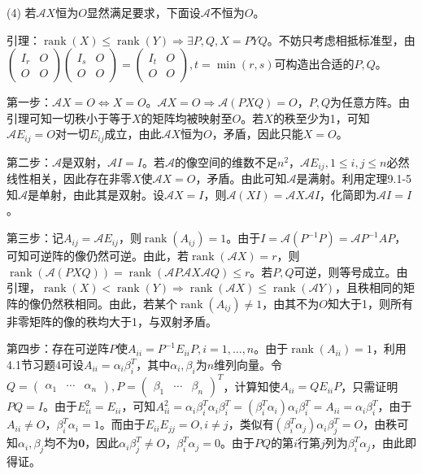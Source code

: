 \documentclass[a4paper,UTF8,fontset=windows]{ctexart}
\DeclareMathOperator{\rank}{rank}
\begin{document}
\begin{enumerate}
(4) 若$\mathcal{A}X$恒为$O$显然满足要求，下面设$\mathcal{A}$不恒为$O$。

引理：$\rank(X)\le\rank(Y)\Rightarrow\exists P,Q,X=PYQ$。不妨只考虑相抵标准型，由$\begin{pmatrix}I_r&O\\O&O\end{pmatrix}\begin{pmatrix}I_s&O\\O&O\end{pmatrix}=\begin{pmatrix}I_t&O\\O&O\end{pmatrix},t=\min(r,s)$可构造出合适的$P,Q$。

第一步：$\mathcal{A}X=O\Leftrightarrow X=O$。$\mathcal{A}X=O\Rightarrow\mathcal{A}(PXQ)=O$，$P,Q$为任意方阵。由引理可知一切秩小于等于$X$的矩阵均被映射至$O$。若$X$的秩至少为1，可知$\mathcal{A}E_{ij}=O$对一切$E_{ij}$成立，由此$\mathcal{A}X$恒为$O$，矛盾，因此只能$X=O$。

第二步：$\mathcal{A}$是双射，$\mathcal{A}I=I$。若$\mathcal{A}$的像空间的维数不足$n^2$，$\mathcal{A}E_{ij},1\le i,j\le n$必然线性相关，因此存在非零$X$使$\mathcal{A}X=O$，矛盾。由此可知$\mathcal{A}$是满射。利用定理9.1-5知$\mathcal{A}$是单射，由此其是双射。设$\mathcal{A}X=I$，则$\mathcal{A}(XI)=\mathcal{A}X\mathcal{A}I$，化简即为$\mathcal{A}I=I$。

第三步：记$A_{ij}=\mathcal{A}E_{ij}$，则$\rank(A_{ij})=1$。由于$I=\mathcal{A}(P^{-1}P)=\mathcal{A}P^{-1}AP$，可知可逆阵的像仍然可逆。由此，若$\rank(\mathcal{A}X)=r$，则$\rank(\mathcal{A}(PXQ))=\rank(\mathcal{A}P\mathcal{A}X\mathcal{A}Q)\le r$。若$P,Q$可逆，则等号成立。由引理，$\rank(X)<\rank(Y)\Rightarrow\rank(\mathcal{A}X)\le\rank(\mathcal{A}Y)$，且秩相同的矩阵的像仍然秩相同。由此，若某个$\rank(A_{ij})\ne1$，由其不为$O$知大于1，则所有非零矩阵的像的秩均大于1，与双射矛盾。

第四步：存在可逆阵$P$使$A_{ii}=P^{-1}E_{ii}P,i=1,\dots,n$。由于$\rank(A_{ii})=1$，利用4.1节习题4可设$A_{ii}=\alpha_i\beta_i^T$，其中$\alpha_i,\beta_i$为$n$维列向量。令$Q=\begin{pmatrix}\alpha_1&\cdots&\alpha_n\end{pmatrix},P=\begin{pmatrix}\beta_1&\cdots&\beta_n\end{pmatrix}^T$，计算知使$A_{ii}=QE_{ii}P$，只需证明$PQ=I$。由于$E_{ii}^2=E_{ii}$，可知$A_{ii}^2=\alpha_i\beta_i^T\alpha_i\beta_i^T=(\beta_i^T\alpha_i)\alpha_i\beta_i^T=A_{ii}=\alpha_i\beta_i^T$，由于$A_{ii}\ne O$，$\beta_i^T\alpha_i=1$。而由于$E_{ii}E_{jj}=O,i\ne j$，类似有$(\beta_i^T\alpha_j)\alpha_i\beta_j^T=O$，由秩可知$\alpha_i,\beta_j$均不为$\mathbf{0}$，因此$\alpha_i\beta_j^T\ne O$，$\beta_i^T\alpha_j=0$。由于$PQ$的第$i$行第$j$列为$\beta_i^T\alpha_j$，由此即得证。


\end{enumerate}
\end{document}

